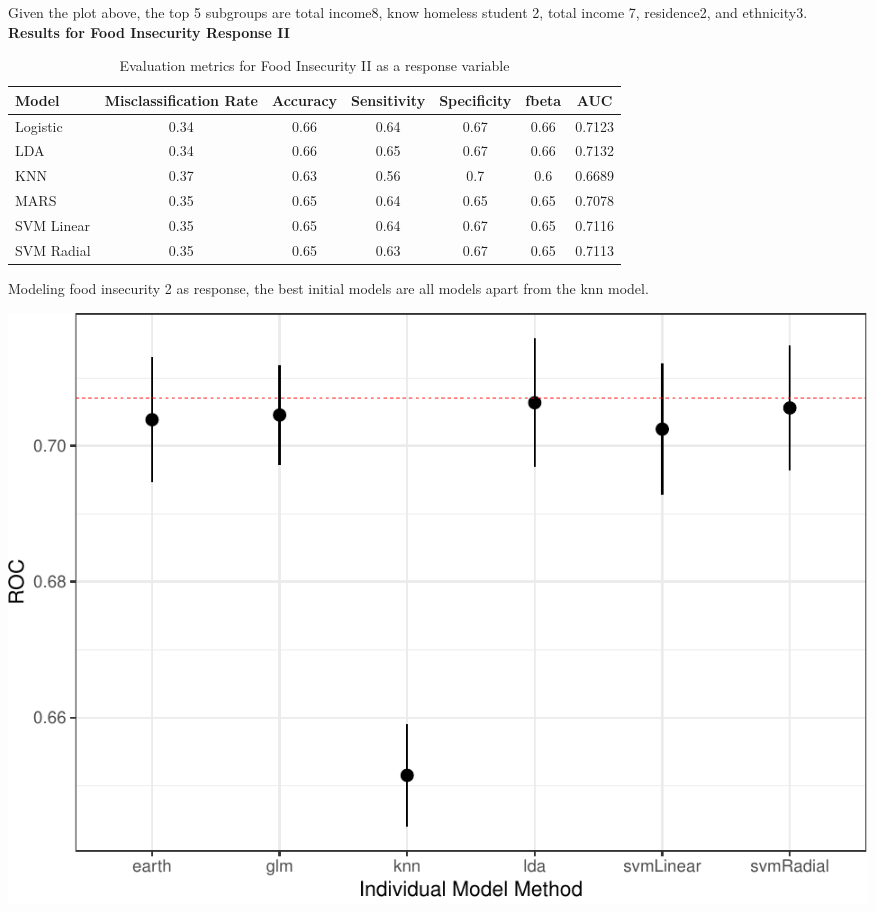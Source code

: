 \documentclass[
  10pt,
]{article}
\begin{document}
Given the plot above, the top 5 subgroups are total income8, know homeless student 2, total income 7, residence2, and ethnicity3.\\

\textbf{Results for Food Insecurity Response II}

\begin{table}[H]

\caption{\label{tab:unnamed-chunk-21}Evaluation metrics for Food Insecurity II  as a response variable}
\centering
\fontsize{12}{14}\selectfont
\begin{tabular}[t]{lcccccc}
\toprule
Model & Misclassification Rate & Accuracy & Sensitivity & Specificity & fbeta & AUC\\
\midrule
Logistic & 0.34 & 0.66 & 0.64 & 0.67 & 0.66 & 0.7123\\
LDA & 0.34 & 0.66 & 0.65 & 0.67 & 0.66 & 0.7132\\
KNN & 0.37 & 0.63 & 0.56 & 0.7 & 0.6 & 0.6689\\
MARS & 0.35 & 0.65 & 0.64 & 0.65 & 0.65 & 0.7078\\
SVM Linear & 0.35 & 0.65 & 0.64 & 0.67 & 0.65 & 0.7116\\
SVM Radial & 0.35 & 0.65 & 0.63 & 0.67 & 0.65 & 0.7113\\
\bottomrule
\end{tabular}
\end{table}

Modeling food insecurity 2 as response, the best initial models are all models apart from the knn model.\\

\begin{center}\includegraphics{final_phase2_report_files/figure-latex/unnamed-chunk-22-1} \end{center}
\end{document}
